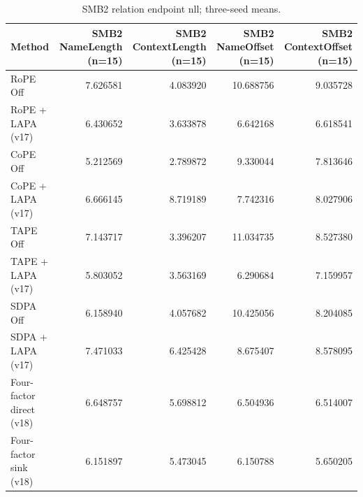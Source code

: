 \begin{table}[t]
\centering
\scriptsize
\caption{SMB2 relation endpoint nll; three-seed means.}
\begin{tabular}{lrrrr}
\toprule
Method & SMB2 NameLength (n=15) & SMB2 ContextLength (n=15) & SMB2 NameOffset (n=15) & SMB2 ContextOffset (n=15) \\
\midrule
RoPE Off & 7.626581 & 4.083920 & 10.688756 & 9.035728 \\
RoPE + LAPA (v17) & 6.430652 & 3.633878 & 6.642168 & 6.618541 \\
CoPE Off & 5.212569 & 2.789872 & 9.330044 & 7.813646 \\
CoPE + LAPA (v17) & 6.666145 & 8.719189 & 7.742316 & 8.027906 \\
TAPE Off & 7.143717 & 3.396207 & 11.034735 & 8.527380 \\
TAPE + LAPA (v17) & 5.803052 & 3.563169 & 6.290684 & 7.159957 \\
SDPA Off & 6.158940 & 4.057682 & 10.425056 & 8.204085 \\
SDPA + LAPA (v17) & 7.471033 & 6.425428 & 8.675407 & 8.578095 \\
Four-factor direct (v18) & 6.648757 & 5.698812 & 6.504936 & 6.514007 \\
Four-factor sink (v18) & 6.151897 & 5.473045 & 6.150788 & 5.650205 \\
\bottomrule
\end{tabular}
\end{table}
